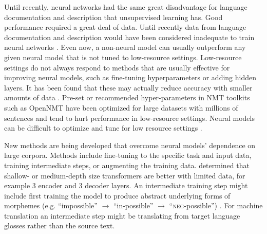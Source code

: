 
Until recently, neural networks had the same great disadvantage for language documentation and description that unsupervised learning has. Good performance required a great deal of data. Until recently data from language documentation and description would have been considered inadequate to train neural networks \citep{duong_natural_2017}.
Even now, a non-neural model can usually outperform any given neural model that is not tuned to low-resource settings. Low-resource settings do not always respond to methods that are usually effective for improving neural models, such as fine-tuning hyperparameters or adding hidden layers. It has been found that these may actually reduce accuracy with smaller amounts of data \citep{cotterell_conll-sigmorphon_2017,popel_training_2018}. Pre-set or recommended hyper-parameters in NMT toolkits such as OpenNMT have been optimized for large datasets with millions of sentences and tend to hurt performance in low-resource settings. Neural models can be difficult to optimize and tune for low resource settings \citep{popel_training_2018}.

New methods are being developed that overcome neural models' dependence on large corpora. Methods include fine-tuning to the specific task and input data, training intermediate steps, or augmenting the training data.
\citet{van_biljon_optimal_2020} determined that shallow- or medium-depth size transformers are better with limited data, for example 3 encoder and 3 decoder layers. An intermediate training step might include first training the model to produce abstract underlying forms of morphemes (e.g. ``impossible'' $\rightarrow$ ``in-possible'' $\rightarrow$ ``\textsc{neg}-possible'') \citep{liu_morphological_2018,moeller_improving_2019}. For machine translation an intermediate step might be translating from target language glosses rather than the source text. 


